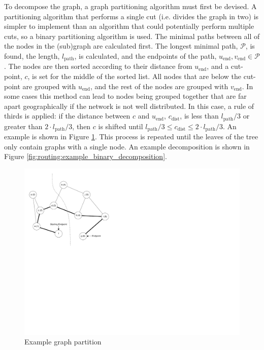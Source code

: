To decompose the graph, a graph partitioning algorithm must first be devised. A partitioning algorithm that performs a single cut (i.e. divides the graph in two) is simpler to implement than an algorithm that could potentially perform multiple cuts, so a binary partitioning algorithm is used. The minimal paths between all of the nodes in the (sub)graph are calculated first. The longest minimal path, $\mathscr{P} $, is found, the length, $l_\textrm{path} $, is calculated, and the endpoints of the path, $u_\textrm{end},v_\textrm{end}\in \mathscr{P} $. The nodes are then sorted according to their distance from $u_\textrm{end} $, and a cut-point, $c$, is set for the middle of the sorted list. All nodes that are below the cut-point are grouped with $u_\textrm{end} $, and the rest of the nodes are grouped with $v_\textrm{end} $. In some cases this method can lead to nodes being grouped together that are far apart geographically if the network is not well distributed. In this case, a rule of thirds is applied: if the distance between $c$ and $u_\textrm{end} $, $c_\textrm{dist} $, is less than $l_\textrm{path}/3 $ or greater than $2\cdot l_\textrm{path}/3 $, then $c$ is shifted until $l_\textrm{path}/3 \leq c_\textrm{dist} \leq 2\cdot l_\textrm{path}/3 $. An example is shown in Figure \ref{fig:routing:example_graph_partition}. This process is repeated until the leaves of the tree only contain graphs with a single node. An example decomposition is shown in Figure \ref{fig:routing:example_binary_decomposition}.

\begin{figure}[ptb]
	\begin{centering}
		\includegraphics{Routing/Figures/routing-example_graph_partition.pdf}
		\caption{Example graph partition}
		\label{fig:routing:example_graph_partition}
	\end{centering}
\end{figure}

